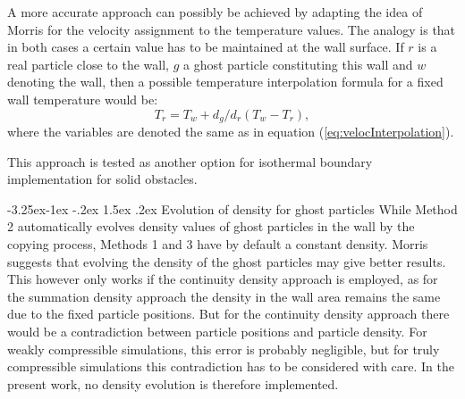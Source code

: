 \documentclass[11pt,a4paper,twoside]{report}
\makeatletter
\renewcommand\paragraph{\@startsection{paragraph}{4}{\z@}%
  {-3.25ex\@plus -1ex \@minus -.2ex}%
  {1.5ex \@plus .2ex}%
  {\normalfont\normalsize\bfseries}}
\makeatother
\begin{document}
A more accurate approach can possibly be achieved by adapting the idea of Morris for the velocity assignment \cite{Morris1997, Zhu1999} to the temperature values. The analogy is that in both cases a certain value has to be maintained at the wall surface. If $r$ is a real particle close to the wall, $g$ a ghost particle constituting this wall and $w$ denoting the wall, then a possible temperature interpolation formula for a fixed wall temperature would be: %
\begin{equation}
 \label{eq:IsothermalBC_T_extrapolation}
T_r=T_w+d_g/d_r(T_w-T_r),
\end{equation} where the variables are denoted the same as in equation (\ref{eq:velocInterpolation}).
 
This approach is tested as another option for isothermal boundary implementation for solid obstacles.


\paragraph{Evolution of density for ghost particles}
While Method 2 automatically evolves density values of ghost particles in the wall by the copying process, Methods 1 and 3 have by default a constant density. Morris \cite{Morris1997, Zhu1999} suggests that evolving the density of the ghost particles may give better results. This however only works if the continuity density approach is employed, as for the summation density approach the density in the wall area remains the same due to the fixed particle positions. But for the continuity density approach there would be a contradiction between particle positions and particle density. For weakly compressible simulations, this error is probably negligible, but for truly compressible simulations this contradiction has to be considered with care. In the present work, no density evolution is therefore implemented. 

\end{document}
